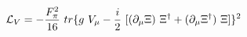 \begin{equation}
{\cal{L}}_V= -\frac{F_\pi^2}{16}~tr \{g~V_\mu -\frac{i}{2}~[(\partial_\mu \Xi)~\Xi^\dag + (\partial_\mu \Xi^\dag)~\Xi]\}^2
\end{equation}

